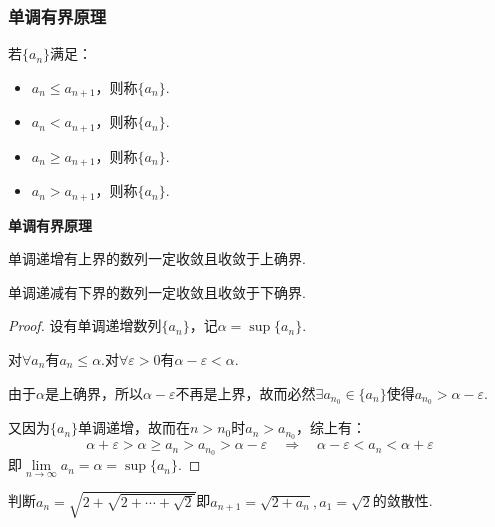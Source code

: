 \subsubsection{单调有界原理}
\begin{definition}
    若$\{a_n\}$满足：
    \begin{itemize}
        \item $a_n \leqslant a_{n+1}$，则称$\{a_n\}$.
        \item $a_n < a_{n+1}$，则称$\{a_n\}$.
        \item $a_n \geqslant a_{n+1}$，则称$\{a_n\}$.
        \item $a_n > a_{n+1}$，则称$\{a_n\}$.
    \end{itemize}
\end{definition}

\begin{theorem}
    \label{thm:MonotoneBounded}
    \textbf{单调有界原理}

    单调递增有上界的数列一定收敛且收敛于上确界.

    单调递减有下界的数列一定收敛且收敛于下确界.
\end{theorem}

\begin{proof}
    设有单调递增数列$\{a_n\}$，记$\alpha = \sup \{a_n\}$.

    对$\forall a_n$有$a_n \leqslant \alpha$.对$\forall \varepsilon > 0$有$\alpha - \varepsilon < \alpha$.

    由于$\alpha$是上确界，所以$\alpha-\varepsilon$不再是上界，故而必然$\exists a_{n_0} \in \{a_n\}$使得$a_{n_0} > \alpha-\varepsilon$.

    又因为$\{a_n\}$单调递增，故而在$n>n_0$时$a_n > a_{n_0}$，综上有：
    \[\alpha+\varepsilon > \alpha \geqslant a_n > a_{n_0} > \alpha-\varepsilon \quad\Rightarrow\quad \alpha-\varepsilon < a_n < \alpha+\varepsilon\]
    即$\lim\limits_{n \to \infty}a_n = \alpha = \sup \{a_n\}$.
\end{proof}

\begin{question}
    判断$a_n = \sqrt{2+\sqrt{2+\cdots+\sqrt{2}}}$即$a_{n+1} = \sqrt{2+a_n}, a_1 = \sqrt{2}$的敛散性.
\end{question}

